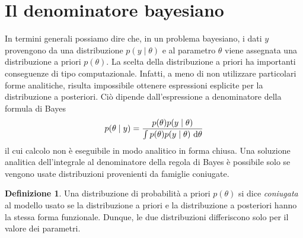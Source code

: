 \documentclass[
  10pt,
  italian,
  a4paper,
  extrafontsizes,onecolumn,openright
  ]{memoir}
\theoremstyle{definition}
\newtheorem{definition}{Definizione}[chapter]
\theoremstyle{definition}
\theoremstyle{definition}
\theoremstyle{definition}
\theoremstyle{remark}
\begin{document}
\hypertarget{il-denominatore-bayesiano}{%
\section{Il denominatore bayesiano}\label{il-denominatore-bayesiano}}

In termini generali possiamo dire che, in un problema bayesiano, i dati \(y\) provengono da una distribuzione \(p(y \mid \theta)\) e al parametro \(\theta\) viene assegnata una distribuzione a priori \(p(\theta)\). La scelta della distribuzione a priori ha importanti conseguenze di tipo computazionale. Infatti, a meno di non utilizzare particolari forme analitiche, risulta impossibile ottenere espressioni esplicite per la distribuzione a posteriori. Ciò dipende dall'espressione a denominatore della formula di Bayes
\begin{equation}
p(\theta \mid y) = \frac{p(\theta) p(y \mid \theta)}{\int p(\theta) p(y \mid \theta) \,\operatorname {d}\! \theta} \notag
\end{equation}
il cui calcolo non è eseguibile in modo analitico in forma chiusa. Una soluzione analitica dell'integrale al denominatore della regola di Bayes è possibile solo se vengono usate distribuzioni provenienti da famiglie coniugate.

\begin{definition}
Una distribuzione di probabilità a priori \(p(\theta)\) si dice \emph{coniugata} al modello usato se la distribuzione a priori e la distribuzione a posteriori hanno la stessa forma funzionale. Dunque, le due distribuzioni differiscono solo per il valore dei parametri.
\end{definition}
\end{document}
